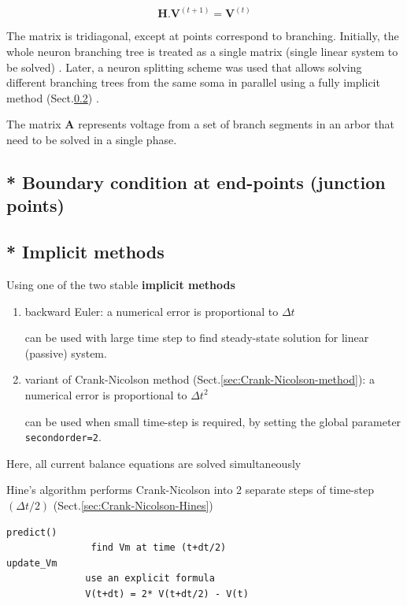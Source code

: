 \begin{equation}
\mathbf{H . V}^{(t+1)} = \mathbf{V}^{(t)}
\end{equation}

The matrix is tridiagonal, except at points correspond to branching. Initially,
the whole neuron branching tree is treated as a single matrix
(single linear system to be solved) \citep{hines1984}.
Later, a neuron splitting scheme was used that allows solving different
branching trees from the same soma in parallel using a
fully implicit method
(Sect.\ref{sec:NEURON-implicit-methods}) \citep{hines2008fip}.

The matrix $\mathbf{A}$ represents voltage from a set of branch segments in an
arbor that need to be solved in a single phase.

\subsection{* Boundary condition at end-points (junction points)}




\subsection{* Implicit methods}
\label{sec:NEURON-implicit-methods}

Using one of the two stable {\bf implicit methods}
\begin{enumerate}
  \item backward Euler: a numerical error is proportional to $\Delta t$
  
  can be used with large time step to find steady-state solution for linear
  (passive) system.
  
  \item variant of Crank-Nicolson method
  (Sect.\ref{sec:Crank-Nicolson-method}):
  a numerical error is proportional to $\Delta t^2$
  
  can be used when small time-step is required, by setting the global parameter 
  \verb!secondorder=2!.
\end{enumerate}

Here, all current balance equations are solved simultaneously

Hine's algorithm performs Crank-Nicolson into 2 separate steps of
time-step $(\Delta t/2)$ (Sect.\ref{sec:Crank-Nicolson-Hines})
\begin{verbatim}
predict()      
               find Vm at time (t+dt/2)
update_Vm      
              use an explicit formula
              V(t+dt) = 2* V(t+dt/2) - V(t)               
\end{verbatim}



